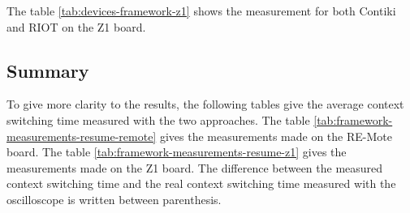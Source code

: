 The table \ref{tab:devices-framework-z1} shows the measurement for both Contiki and RIOT on the Z1 board.



\subsection{Summary}
To give more clarity to the results, the following tables give the average context switching time measured with the two approaches.
The table \ref{tab:framework-measurements-resume-remote} gives the measurements made on the RE-Mote board.
The table \ref{tab:framework-measurements-resume-z1} gives the measurements made on the Z1 board.
The difference between the measured context switching time and the real context switching time measured with the oscilloscope is written between parenthesis.




